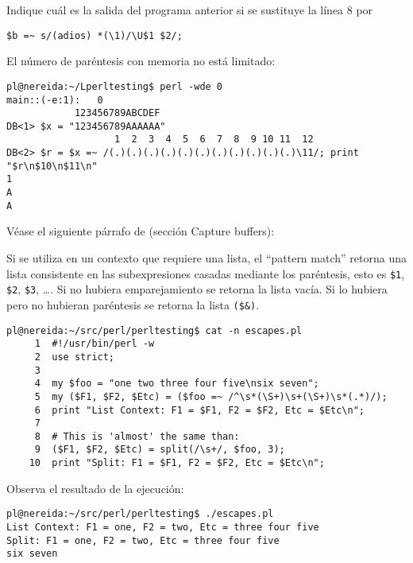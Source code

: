 \begin{exercise}
Indique cuál es la salida del programa anterior si se sustituye la línea 8 por
\begin{verbatim}
$b =~ s/(adios) *(\1)/\U$1 $2/;
\end{verbatim}
\end{exercise}


El número de paréntesis con memoria no está limitado:
\begin{verbatim}
pl@nereida:~/Lperltesting$ perl -wde 0
main::(-e:1):   0
            123456789ABCDEF
DB<1> $x = "123456789AAAAAA"
                   1  2  3  4  5  6  7  8  9 10 11  12
DB<2> $r = $x =~ /(.)(.)(.)(.)(.)(.)(.)(.)(.)(.)(.)\11/; print "$r\n$10\n$11\n"
1
A
A
\end{verbatim}

Véase el siguiente párrafo de  (sección Capture buffers):


Si se utiliza en un contexto que requiere una lista,
el ``pattern match'' retorna una lista consistente en
las subexpresiones casadas mediante los paréntesis,
esto es \verb|$1|, \verb|$2|, \verb|$3|, \ldots. 
Si no hubiera emparejamiento se retorna la lista vacía.
Si lo hubiera pero no hubieran paréntesis se retorna la lista 
\verb|($&)|.

\begin{verbatim}
pl@nereida:~/src/perl/perltesting$ cat -n escapes.pl
     1  #!/usr/bin/perl -w
     2  use strict;
     3
     4  my $foo = "one two three four five\nsix seven";
     5  my ($F1, $F2, $Etc) = ($foo =~ /^\s*(\S+)\s+(\S+)\s*(.*)/);
     6  print "List Context: F1 = $F1, F2 = $F2, Etc = $Etc\n";
     7
     8  # This is 'almost' the same than:
     9  ($F1, $F2, $Etc) = split(/\s+/, $foo, 3);
    10  print "Split: F1 = $F1, F2 = $F2, Etc = $Etc\n";
\end{verbatim}
Observa el resultado de la ejecución:
\begin{verbatim}
pl@nereida:~/src/perl/perltesting$ ./escapes.pl
List Context: F1 = one, F2 = two, Etc = three four five
Split: F1 = one, F2 = two, Etc = three four five
six seven
\end{verbatim}

